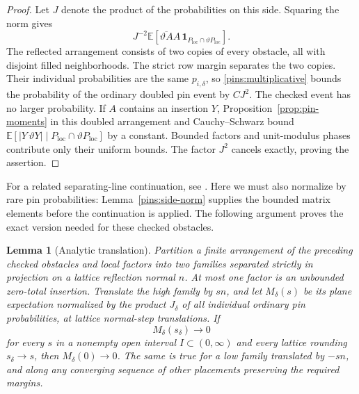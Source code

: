 \documentclass[11pt]{article}
\newtheorem{lemma}[theorem]{Lemma}
\theoremstyle{definition}
\theoremstyle{remark}
\numberwithin{equation}{section}
\begin{document}
\begin{proof}
Let $J$ denote the product of the probabilities on this side.  Squaring
the norm gives
\[
 J^{-2}\mathbb E\left[\overline{\vartheta A}A\,
    \mathbf 1_{P_{\mathrm{loc}}\cap\vartheta P_{\mathrm{loc}}}\right].
\]
The reflected arrangement consists of two copies of every obstacle,
all with disjoint filled neighborhoods.  The strict row margin
separates the two copies.  Their individual probabilities are the
same $p_{i,\delta}$, so \eqref{pins:multiplicative} bounds the
probability of the ordinary doubled pin event by $CJ^2$.
The checked event has no larger probability.  If $A$ contains an
insertion $Y$, Proposition~\ref{prop:pin-moments} in this doubled
arrangement and Cauchy--Schwarz bound
$\mathbb E[|Y\,\vartheta Y|\mid P_{\mathrm{loc}}\cap
\vartheta P_{\mathrm{loc}}]$ by a constant.  Bounded factors and
unit-modulus phases contribute only their uniform bounds.  The
factor $J^2$ cancels exactly, proving the assertion.
\end{proof}

For a related separating-line continuation, see
\cite[Section~7.1, Lemma~7.4]{DCKLM2026}.
Here we must also normalize by rare pin probabilities:
Lemma~\ref{pins:side-norm} supplies the bounded matrix elements before
the continuation is applied.  The following argument proves the exact
version needed for these checked obstacles.

\begin{lemma}[Analytic translation]\label{lem:analytic-translation}
Partition a finite arrangement of the preceding checked obstacles and
local factors into two families separated strictly in projection on a
lattice reflection normal $n$.  At most one factor is an unbounded
zero-total insertion.  Translate the high family by $sn$, and let
$M_\delta(s)$ be its plane expectation normalized by the product
$J_\delta$ of all individual ordinary pin probabilities, at lattice
normal-step translations.  If
\[
 M_\delta(s_\delta)\longrightarrow0
\]
for every $s$ in a nonempty open interval $I\subset(0,\infty)$ and
every lattice rounding $s_\delta\to s$, then $M_\delta(0)\to0$.
The same is true for a low family translated by $-sn$, and along any
converging sequence of other placements preserving the required margins.
\end{lemma}
\end{document}
